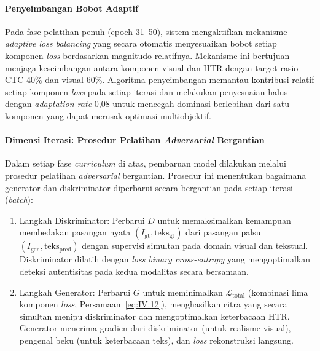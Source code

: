 \paragraph{Penyeimbangan Bobot Adaptif}

Pada fase pelatihan penuh (epoch 31--50), sistem mengaktifkan mekanisme \textit{adaptive loss balancing} yang secara otomatis menyesuaikan bobot setiap komponen \textit{loss} berdasarkan magnitudo relatifnya. Mekanisme ini bertujuan menjaga keseimbangan antara komponen visual dan HTR dengan target rasio CTC 40\% dan visual 60\%. Algoritma penyeimbangan memantau kontribusi relatif setiap komponen \textit{loss} pada setiap iterasi dan melakukan penyesuaian halus dengan \textit{adaptation rate} 0,08 untuk mencegah dominasi berlebihan dari satu komponen yang dapat merusak optimasi multiobjektif.

\paragraph{Dimensi Iterasi: Prosedur Pelatihan \textit{Adversarial} Bergantian}


Dalam setiap fase \textit{curriculum} di atas, pembaruan model dilakukan melalui prosedur pelatihan \textit{adversarial} bergantian. Prosedur ini menentukan bagaimana generator dan diskriminator diperbarui secara bergantian pada setiap iterasi (\textit{batch}):

\begin{enumerate}[label=\alph*., leftmargin=1.5em, labelsep=0.5em, itemindent=0pt, noitemsep, topsep=0pt]
  \item Langkah Diskriminator: Perbarui $D$ untuk memaksimalkan kemampuan membedakan pasangan nyata $(I_{\text{gt}}, \text{teks}_{\text{gt}})$ dari pasangan palsu $(I_{\text{gen}}, \text{teks}_{\text{pred}})$ dengan supervisi simultan pada domain visual dan tekstual. Diskriminator dilatih dengan \textit{loss binary cross-entropy} yang mengoptimalkan deteksi autentisitas pada kedua modalitas secara bersamaan.

  \item Langkah Generator: Perbarui $G$ untuk meminimalkan $\mathcal{L}_{\text{total}}$ (kombinasi lima komponen \textit{loss}, Persamaan~\ref{eq:IV.12}), menghasilkan citra yang secara simultan menipu diskriminator dan mengoptimalkan keterbacaan HTR. Generator menerima gradien dari diskriminator (untuk realisme visual), pengenal beku (untuk keterbacaan teks), dan \textit{loss} rekonstruksi langsung.
\end{enumerate}

